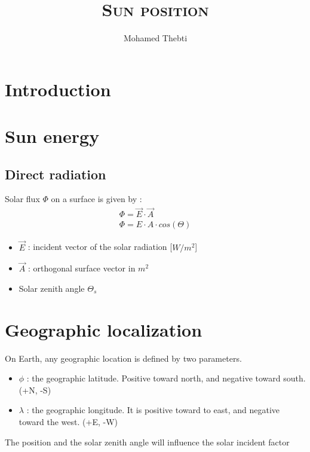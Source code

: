 \documentclass[12pt,a4paper]{article}
\title{
	\Huge\textsc{Sun position}
}
\author{Mohamed Thebti}
\begin{document}
\setlength{\parindent}{0mm}

\fancyhead[R]{\slshape \leftmark}

\fancyfoot[C]{}
\fancyfoot[R]{\thepage}

\maketitle
\newpage

\tableofcontents

\newpage



\section{Introduction}

\section{Sun energy}

\subsection{Direct radiation}
Solar flux $\Phi$ on a surface is given by : 
\begin{eqnarray}
\Phi = \vec{E} \cdot \vec{A} \\
\Phi = E \cdot A \cdot cos(\Theta)
\end{eqnarray}
\begin{itemize}
	\item $\vec{E}$ : incident vector of the solar radiation [$W/m^2$]
	\item $\vec{A}$ : orthogonal surface vector in $m^2$
	\item Solar zenith angle $\Theta_s$ 
\end{itemize}
\section{Geographic localization}
On Earth, any geographic location is defined by two parameters.
\begin{itemize}
	\item $\phi$ : the geographic latitude. Positive toward north, and negative toward south. (+N, -S)
	\item $\lambda$ : the geographic longitude. It is positive toward to east, and negative toward the west. (+E, -W)
\end{itemize}
The position and the solar zenith angle will influence the solar incident factor
\end{document}

